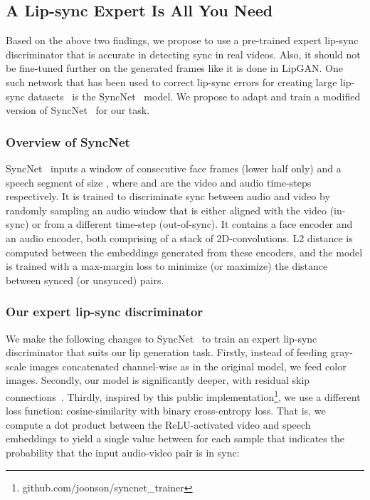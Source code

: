 \documentclass[sigconf]{acmart}
\begin{document}
\subsection{A Lip-sync Expert Is All You Need}
\label{subsection:syncnet}
Based on the above two findings, we propose to use a pre-trained expert lip-sync discriminator that is accurate in detecting sync in real videos. Also, it should not be fine-tuned further on the generated frames like it is done in LipGAN. One such network that has been used to correct lip-sync errors for creating large lip-sync datasets~\cite{Afouras18c,afouras2018lrs3} is the SyncNet~\cite{Chung16a} model. We propose to adapt and train a modified version of SyncNet~\cite{Chung16a} for our task. 

\subsubsection{Overview of SyncNet} SyncNet~\cite{Chung16a} inputs a window  of  consecutive face frames (lower half only) and a speech segment  of size , where  and  are the video and audio time-steps respectively. It is trained to discriminate sync between audio and video by randomly sampling an audio window  that is either aligned with the video (in-sync) or from a different time-step (out-of-sync). It contains a face encoder and an audio encoder, both comprising of a stack of 2D-convolutions. L2 distance is computed between the embeddings generated from these encoders, and the model is trained with a max-margin loss to minimize (or maximize) the distance between synced (or unsynced) pairs. 

\subsubsection{Our expert lip-sync discriminator} We make the following changes to SyncNet~\cite{Chung16a} to train an expert lip-sync discriminator that suits our lip generation task. Firstly, instead of feeding gray-scale images concatenated channel-wise as in the original model, we feed color images. Secondly, our model is significantly deeper, with residual skip connections~\cite{he2016deep}. Thirdly, inspired by this public implementation\footnote{github.com/joonson/syncnet\_trainer}, we use a different loss function: cosine-similarity with binary cross-entropy loss. That is, we compute a dot product between the ReLU-activated video and speech embeddings  to yield a single value between  for each sample that indicates the probability that the input audio-video pair is in sync: 
\end{document}
